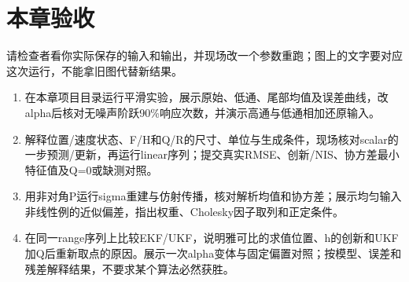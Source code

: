 \section{本章验收}
请检查者看你实际保存的输入和输出，并现场改一个参数重跑；图上的文字要对应这次运行，不能拿旧图代替新结果。
\begin{enumerate}
\item 在本章项目目录运行平滑实验，展示原始、低通、尾部均值及误差曲线，改alpha后核对无噪声阶跃90\%响应次数，并演示高通与低通相加还原输入。
\item 解释位置/速度状态、F/H和Q/R的尺寸、单位与生成条件，现场核对scalar的一步预测/更新，再运行linear序列；提交真实RMSE、创新/NIS、协方差最小特征值及Q=0或缺测对照。
\item 用非对角P运行sigma重建与仿射传播，核对解析均值和协方差；展示均匀输入非线性例的近似偏差，指出权重、Cholesky因子取列和正定条件。
\item 在同一range序列上比较EKF/UKF，说明雅可比的求值位置、h的创新和UKF加Q后重新取点的原因。展示一次alpha变体与固定偏置对照；按模型、误差和残差解释结果，不要求某个算法必然获胜。
\end{enumerate}
